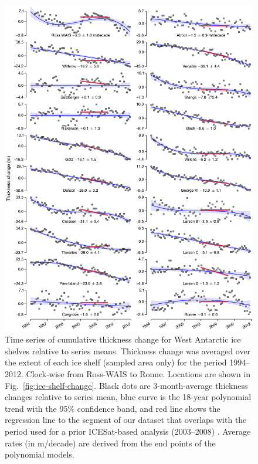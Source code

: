 \begin{figure}[!h]
  \centering
  \includegraphics[width=.95\textwidth]{img/Sup1_ts_shelves_weis_review_v6.png}
  \caption[Time series of cumulative thickness change for West]{
  \ssp \footnotesize
Time series of cumulative thickness change for West Antarctic ice shelves relative to series means. Thickness change was averaged over the extent of each ice shelf (sampled area only) for the period 1994--2012. Clock-wise from Ross-WAIS to Ronne. Locations are shown in Fig.~\ref{fig:ice-shelf-change}. Black dots are 3-month-average thickness changes relative to series mean, blue curve is the 18-year polynomial trend with the 95\% confidence band, and red line shows the regression line to the segment of our dataset that overlaps with the period used for a prior ICESat-based analysis (2003--2008) \parencite{Pritchard2012}. Average rates (in m/decade) are derived from the end points of the polynomial models.
  }
  \label{fig:ts-ice-shelves-wais}
\end{figure}

